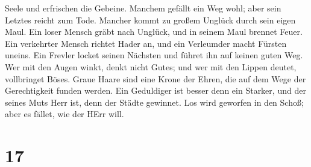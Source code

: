 Seele und erfrischen die Gebeine.  Manchem gefällt ein Weg
wohl; aber sein Letztes reicht zum Tode.  Mancher kommt zu
großem Unglück durch sein eigen Maul.  Ein loser Mensch
gräbt nach Unglück, und in seinem Maul brennet Feuer.  Ein
verkehrter Mensch richtet Hader an, und ein Verleumder macht Fürsten
uneins.  Ein Frevler locket seinen Nächsten und führet ihn
auf keinen guten Weg.  Wer mit den Augen winkt, denkt nicht
Gutes; und wer mit den Lippen deutet, vollbringet Böses. 
Graue Haare sind eine Krone der Ehren, die auf dem Wege der
Gerechtigkeit funden werden.  Ein Geduldiger ist besser
denn ein Starker, und der seines Muts Herr ist, denn der Städte
gewinnet.  Los wird geworfen in den Schoß; aber es fället,
wie der HErr will.

\hypertarget{section-16}{%
\section{17}\label{section-16}}

